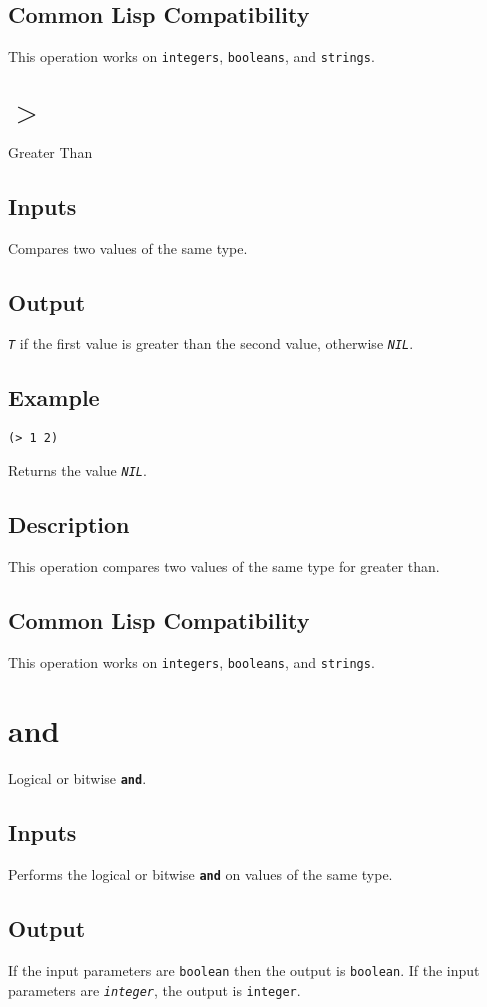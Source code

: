 \documentclass[10pt, openany]{book}
\newcommand{\operation}[1]{\textbf{\texttt{#1}}}
\newcommand{\constant}[1]{\emph{\texttt{#1}}}
\newcommand{\datatype}[1]{\texttt{#1}}
\begin{document}
\subsection{Common Lisp Compatibility}
This operation works on \datatype{integers}, \datatype{booleans}, and \datatype{strings}.

\section{$>$}
Greater Than
\subsection{Inputs}
Compares two values of the same type.
\subsection{Output}
\constant{T} if the first value is greater than the second value, otherwise \constant{NIL}.
\subsection{Example}
\begin{lstlisting}
(> 1 2)
\end{lstlisting}
Returns the value \constant{NIL}.
\subsection{Description}
This operation compares two values of the same type for greater than.
\subsection{Common Lisp Compatibility}
This operation works on \datatype{integers}, \datatype{booleans}, and \datatype{strings}.

\section{and}
Logical or bitwise \operation{and}.
\subsection{Inputs}
Performs the logical or bitwise \operation{and} on values of the same type.
\subsection{Output}
If the input parameters are \datatype{boolean} then the output is \datatype{boolean}.  If the input parameters are \constant{integer}, the output is \datatype{integer}.
\end{document}
